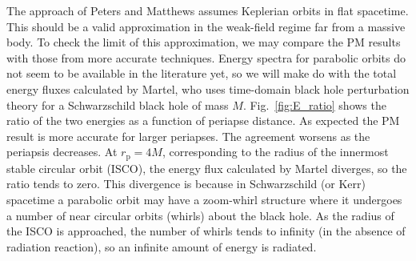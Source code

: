 \documentclass[aps,prd,reprint,showpacs,groupedaddress]{revtex4-1}
\newcommand{\Figref}[1]{Fig.\ \ref{fig:#1}}
\newcommand{\sub}[1]{\ensuremath{_\text{#1}}}
\begin{document}
The approach of Peters and Matthews assumes Keplerian orbits in flat spacetime. This should be a valid approximation in the weak-field regime far from a massive body. To check the limit of this approximation, we may compare the PM results with those from more accurate techniques. Energy spectra for parabolic orbits do not seem to be available in the literature yet, so we will make do with the total energy fluxes calculated by Martel\cite{Martel2004a}, who uses time-domain black hole perturbation theory for a Schwarzschild black hole of mass $M$. \Figref{E_ratio} shows the ratio of the two energies as a function of periapse distance. As expected the PM result is more accurate for larger periapses. The agreement worsens as the periapsis decreases. At $r\sub{p} = 4 M$, corresponding to the radius of the innermost stable circular orbit (ISCO), the energy flux calculated by Martel diverges, so the ratio tends to zero. This divergence is because in Schwarzschild (or Kerr) spacetime a parabolic orbit may have a zoom-whirl structure where it undergoes a number of near circular orbits (whirls) about the black hole. As the radius of the ISCO is approached, the number of whirls tends to infinity (in the absence of radiation reaction), so an infinite amount of energy is radiated.
\end{document}
